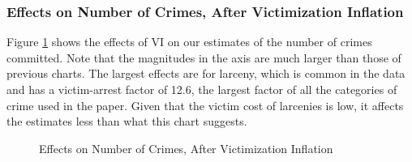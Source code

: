 \subsubsection{Effects on Number of Crimes, After Victimization Inflation}
\noindent Figure \ref{fig:count-vi} shows the effects of VI on our estimates of the number of crimes committed. Note that the magnitudes in the axis are much larger than those of previous charts. The largest effects are for larceny, which is common in the data and has a victim-arrest factor of 12.6, the largest factor of all the categories of crime used in the paper. Given that the victim cost of larcenies is low, it affects the estimates less than what this chart suggests. \\

\begin{figure}[H]
\caption{Effects on Number of Crimes, After Victimization Inflation}
\centering \label{fig:count-vi}
{}
\end{figure}

